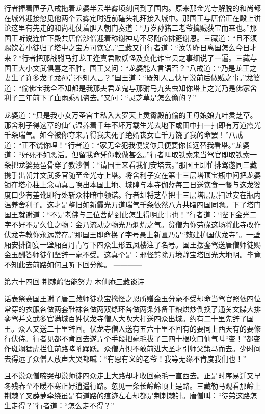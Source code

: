 \documentclass[12pt,UTF8]{ctexbook}
\begin{document}
行者捧着匣子八戒拖着龙婆半云半雾顷刻间到了国内。原来那金光寺解脱的和尚都在城外迎接忽见他两个云雾定时近前磕头礼拜接入城中。那国王与唐僧正在殿上讲论这里有先走的和尚礼仗着胆入朝门奏道：“万岁孙猪二老爷擒贼获宝而来也。”那国王听说连忙下殿共唐僧沙僧迎着称谢神功不尽随命排筵谢恩。三藏道：“且不须赐饮着小徒归了塔中之宝方可饮宴。”三藏又问行者道：“汝等昨日离国怎么今日才来？”行者把那战驸马打龙王逢真君败妖怪及变化诈宝贝之事细说了一遍。三藏与国王大小文武俱喜之不胜。国王又问：“龙婆能人言语否？”八戒道：“乃是龙王之妻生了许多龙子龙孙岂不知人言？”国王道：“既知人言快早说前后做贼之事。”龙婆道：“偷佛宝我全不知都是我那夫君龙鬼与那驸马九头虫知你塔上之光乃是佛家舍利子三年前下了血雨乘机盗去。”又问：“灵芝草是怎么偷的？”

龙婆道：“只是我小女万圣宫主私入大罗天上灵霄殿前偷的王母娘娘九叶灵芝草。那舍利子得这草的仙气温养着千年不坏万载生光去地下或田中扫一扫即有万道霞光千条瑞气。如今被你夺来弄得我夫死子绝婿丧女亡千万饶了我的命罢！”八戒道：“正不饶你哩！”行者道：“家无全犯我便饶你只便要你长远替我看塔。”龙婆道：“好死不如恶活。但留我命凭你教做甚么。”行者叫取铁索来当驾官即取铁索一条把龙婆琵琶骨穿了教沙僧：“请国王来看我们安塔去。”那国王即忙排驾遂同三藏携手出朝并文武多官随至金光寺上塔。将舍利子安在第十三层塔顶宝瓶中间把龙婆锁在塔心柱上念动真言唤出本国土地、城隍与本寺伽蓝每三日送饮食一餐与这龙婆度口少有差讹即行处斩众神暗中领诺。行者却将芝草把十三层塔层层扫过安在瓶内温养舍利子。这才是整旧如新霞光万道瑞气千条依然八方共睹四国同瞻。下了塔门国王就谢道：“不是老佛与三位菩萨到此怎生得明此事也！”行者道：“陛下金光二字不好不是久住之物：金乃流动之物光乃熌灼之气。贫僧为你劳碌这场将此寺改作伏龙寺教你永远常存。”那国王即命换了字号悬上新匾乃是“敕建护国伏龙寺”。一壁厢安排御宴一壁厢召丹青写下四众生形五凤楼注了名号。国王摆銮驾送唐僧师徒赐金玉酬答师徒们坚辞一毫不受。这真个是：邪怪剪除万境静宝塔回光大地明。毕竟不知此去前路如何且听下回分解。
------------

第六十四回 荆棘岭悟能努力 木仙庵三藏谈诗

话表祭赛国王谢了唐三藏师徒获宝擒怪之恩所赠金玉分毫不受却命当驾官照依四位常穿的衣服各做两套鞋袜各做两双绦环各做两条外备干粮烘炒倒换了通关文牒大排銮驾并文武多官满城百姓伏龙寺僧人大吹大打送四众出城。约有二十里先辞了国王。众人又送二十里辞回。伏龙寺僧人送有五六十里不回有的要同上西天有的要修行伏侍。行者见都不肯回去遂弄个手段把毫毛拔了三四十根吹口仙气叫“变！”都变作斑斓猛虎拦住前路哮吼踊跃。众僧方惧不敢前进大圣才引师父策马而去。少时间去得远了众僧人放声大哭都喊：“有恩有义的老爷！我等无缘不肯度我们也！”

且不说众僧啼哭却说师徒四众走上大路却才收回毫毛一直西去。正是时序易迁又早冬残春至不暖不寒正好逍遥行路。忽见一条长岭岭顶上是路。三藏勒马观看那岭上荆棘丫叉薜萝牵绕虽是有道路的痕迹左右却都是荆刺棘针。唐僧叫：“徒弟这路怎生走得？”行者道：“怎么走不得？”
\end{document}
